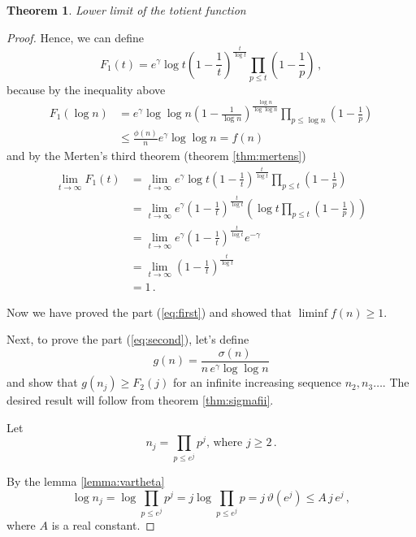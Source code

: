 \documentclass{article}
\theoremstyle{definition}
\newtheorem{theorem}[subsubsection]{Theorem}
\begin{document}
\begin{theorem}{\emph{Lower limit of the totient function}}
\begin{proof}
Hence, we can define
\begin{equation*}
    F_1(t)=e^\gamma \log t \left(1-\frac{1}{t}\right)^\frac{t}{\log t} \prod_{p\leq t} \left(1-\frac{1}{p}\right)\,,
\end{equation*}
because by the inequality above
\begin{align*}
    F_1(\log n) & = e^\gamma \log \log n \left(1-\frac{1}{\log n}\right)^\frac{\log n}{\log \log n} \prod_{p\leq \log n} \left(1-\frac{1}{p}\right)\\
    & \leq \frac{\phi(n)}{n} e^\gamma \log\log n = f(n)
\end{align*}
and by the Merten's third theorem (theorem \ref{thm:mertens})
\begin{align*}
    \lim_{t \rightarrow \infty} F_1(t) & = \lim_{t \rightarrow \infty} e^\gamma \log t \left(1-\frac{1}{t}\right)^\frac{t}{\log t} \prod_{p\leq t} \left(1-\frac{1}{p}\right)\\
    & = \lim_{t \rightarrow \infty} e^\gamma \left( 1-\frac{1}{t}\right)^\frac{t}{\log t} \left(\log t \prod_{p\leq t} \left(1-\frac{1}{p}\right) \right)\\
    & = \lim_{t \rightarrow \infty} e^\gamma \left( 1-\frac{1}{t}\right)^\frac{t}{\log t} e^{-\gamma}\\
    & = \lim_{t \rightarrow \infty} \left( 1-\frac{1}{t}\right)^\frac{t}{\log t}\\
    & = 1\,.
\end{align*}

Now we have proved the part (\ref{eq:first}) and showed that
$\liminf{f(n)}\geq 1$.

Next, to prove the part (\ref{eq:second}), let's define
\begin{equation*}
    g(n)=\frac{\sigma(n)}{n\,e^\gamma \log\log n}
\end{equation*}
and show that $g(n_j) \geq F_2(j)$ for an infinite increasing sequence $n_2,n_3\dots$. The desired result will follow from theorem \ref{thm:sigmafii}.

Let
\begin{equation*}
    n_j=\prod_{p\leq e^j} p^j\text{, where } j\geq 2\,.
\end{equation*}

By the lemma \ref{lemma:vartheta}
\begin{equation*}
    \log n_j = \log \prod_{p\leq e^j} p^j = j \log \prod_{p\leq e^j} p = j\,\vartheta(e^j) \leq A\,j\,e^j\,,
\end{equation*}
where $A$ is a real constant.


\end{proof}
\end{theorem}
\end{document}
